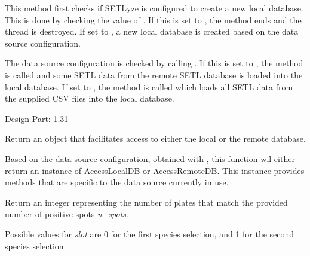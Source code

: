 \documentclass[letterpaper,10pt,english]{sphinxmanual}
\begin{document}
\begin{fulllineitems}
\begin{fulllineitems}
This method first checks if SETLyze is configured to create
a new local database. This is done by checking the value of
. If this is set to
, the method ends and the thread is destroyed. If set
to , a new local database is created based on the data
source configuration.

The data source configuration is checked by calling
. If this is set to
, the method  is called and
some SETL data from the remote SETL database is loaded into the
local database. If set to , the method
 is called which loads all SETL data from the
supplied CSV files into the local database.

Design Part: 1.31

\end{fulllineitems}


\end{fulllineitems}


\begin{fulllineitems}
\label{setlyze/database:setlyze.database.get_database_accessor}
Return an object that facilitates access to either the local or
the remote database.

Based on the data source configuration, obtained with
, this function wil either
return an instance of AccessLocalDB or AccessRemoteDB. This instance
provides methods that are specific to the data source currently in
use.

\end{fulllineitems}


\begin{fulllineitems}
\label{setlyze/database:setlyze.database.get_plates_total_matching_spots_total}
Return an integer representing the number of plates that
match the provided number of positive spots \emph{n\_spots}.

Possible values for \emph{slot} are 0 for the first species selection,
and 1 for the second species selection.

\end{fulllineitems}
\end{document}
